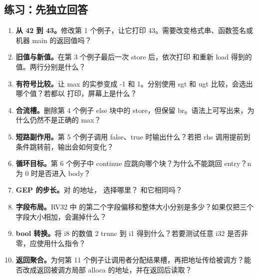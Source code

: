 \subsection{练习：先独立回答}
\begin{enumerate}[label=\textbf{\arabic*.}]
 \item \textbf{从 42 到 43。}修改第 1 个例子，让它打印 43。需要改变格式串、函数签名或机器 main 的返回值吗？
 \item \textbf{旧值与新值。}在第 3 个例子最后一次 store 后，依次打印  和重新 load 得到的值。两行分别是什么？
 \item \textbf{有符号比较。}让 max 的实参变成 -1 和 1。分别使用 sgt 和 ugt 比较，会选出哪个值？若都以  打印，屏幕上是什么？
 \item \textbf{合流槽。}删除第 4 个例子 else 块中的 store，但保留 br。语法上可写出来，为什么仍然不是正确的 max？
 \item \textbf{短路副作用。}第 5 个例子调用 false、true 时输出什么？若把 rhs 调用提前到条件跳转前，输出会如何变化？
 \item \textbf{循环目标。}第 6 个例子中 continue 应跳向哪个块？为什么不能跳回 entry？n 为 0 时是否进入 body？
 \item \textbf{GEP 的步长。}对 \code{[3 x i32]} 的地址， 选择哪里？ 和它相同吗？
 \item \textbf{字段布局。}RV32 中  的第二个字段偏移和整体大小分别是多少？如果仅把三个字段大小相加，会漏掉什么？
 \item \textbf{bool 转换。}将 i8 的数值 2 trunc 到 i1 得到什么？若要测试任意 i32 是否非零，应使用什么指令？
 \item \textbf{返回聚合。}为何第 11 个例子让调用者分配结果槽，再把地址传给被调方？能否改成返回被调方局部 alloca 的地址，并在返回后读取？
\end{enumerate}

